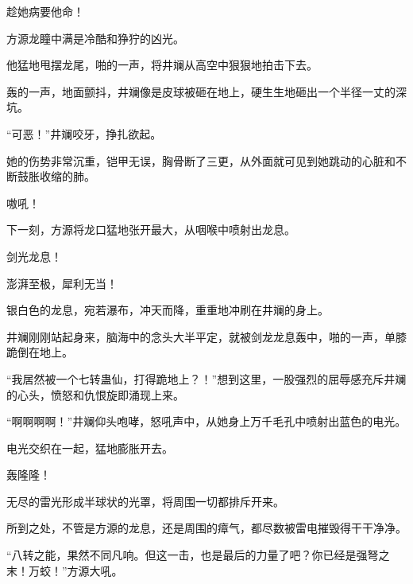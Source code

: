 \begin{this_body}
趁她病要他命！

方源龙瞳中满是冷酷和狰狞的凶光。

他猛地甩摆龙尾，啪的一声，将井斓从高空中狠狠地拍击下去。

轰的一声，地面颤抖，井斓像是皮球被砸在地上，硬生生地砸出一个半径一丈的深坑。

“可恶！”井斓咬牙，挣扎欲起。

她的伤势非常沉重，铠甲无误，胸骨断了三更，从外面就可见到她跳动的心脏和不断鼓胀收缩的肺。

嗷吼！

下一刻，方源将龙口猛地张开最大，从咽喉中喷射出龙息。

剑光龙息！

澎湃至极，犀利无当！

银白色的龙息，宛若瀑布，冲天而降，重重地冲刷在井斓的身上。

井斓刚刚站起身来，脑海中的念头大半平定，就被剑龙龙息轰中，啪的一声，单膝跪倒在地上。

“我居然被一个七转蛊仙，打得跪地上？！”想到这里，一股强烈的屈辱感充斥井斓的心头，愤怒和仇恨旋即涌现上来。

“啊啊啊啊！”井斓仰头咆哮，怒吼声中，从她身上万千毛孔中喷射出蓝色的电光。

电光交织在一起，猛地膨胀开去。

轰隆隆！

无尽的雷光形成半球状的光罩，将周围一切都排斥开来。

所到之处，不管是方源的龙息，还是周围的瘴气，都尽数被雷电摧毁得干干净净。

“八转之能，果然不同凡响。但这一击，也是最后的力量了吧？你已经是强弩之末！万蛟！”方源大吼。

\end{this_body}


